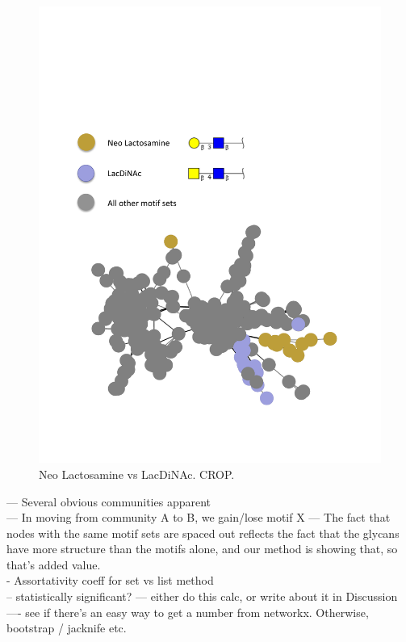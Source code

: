 \documentclass[12pt,a4paper]{article}
\begin{document}
\begin{figure}[H]
\centering 
\includegraphics[scale=0.7]{motif_similarity_exploration/Neo_Lactosamine_vs_LacDiNAc.pdf} 
\caption{Neo Lactosamine vs LacDiNAc. CROP.}
\label{fig:Neo_Lactosamine_vs_LacDiNAc}
\end{figure}


--- Several obvious communities apparent\\
--- In moving from community A to B, we gain/lose motif X
--- The fact that nodes with the same motif sets are spaced out reflects the fact that the glycans have more structure than the motifs alone, and our method is showing that, so that's added value.\\

- Assortativity coeff for set vs list method\\
-- statistically significant?
--- either do this calc, or write about it in Discussion \\
---- see if there's an easy way to get a number from networkx. Otherwise, bootstrap / jacknife etc. \\
\end{document}
